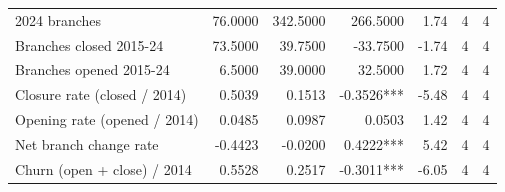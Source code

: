 \begin{tabular}{lrrrrrr}
2024 branches & 76.0000 & 342.5000 & 266.5000 & 1.74 & 4 & 4 \\
Branches closed 2015-24 & 73.5000 & 39.7500 & -33.7500 & -1.74 & 4 & 4 \\
Branches opened 2015-24 & 6.5000 & 39.0000 & 32.5000 & 1.72 & 4 & 4 \\
Closure rate (closed / 2014) & 0.5039 & 0.1513 & -0.3526*** & -5.48 & 4 & 4 \\
Opening rate (opened / 2014) & 0.0485 & 0.0987 & 0.0503 & 1.42 & 4 & 4 \\
Net branch change rate & -0.4423 & -0.0200 & 0.4222*** & 5.42 & 4 & 4 \\
Churn (open + close) / 2014 & 0.5528 & 0.2517 & -0.3011*** & -6.05 & 4 & 4 \\
\bottomrule
\end{tabular}

